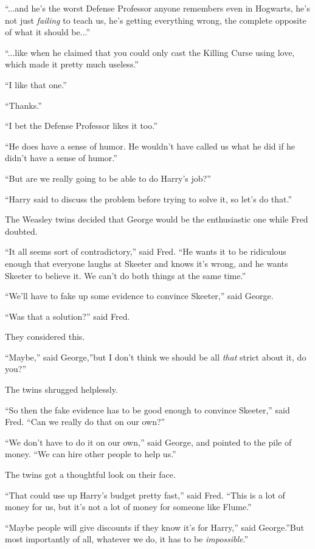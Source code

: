 ``...and he's the worst Defense Professor anyone remembers even in
Hogwarts, he's not just \emph{failing} to teach us, he's getting
everything wrong, the complete opposite of what it should be...''

``...like when he claimed that you could only cast the Killing
Curse using love, which made it pretty much useless.''

``I like that one.''

``Thanks.''

``I bet the Defense Professor likes it too.''

``He does have a sense of humor. He wouldn't have called us what he did
if he didn't have a sense of humor.''

``But are we really going to be able to do Harry's job?''

``Harry said to discuss the problem before trying to solve it, so let's
do that.''

The Weasley twins decided that George would be the enthusiastic one
while Fred doubted.

``It all seems sort of contradictory,'' said Fred. ``He wants it to be
ridiculous enough that everyone laughs at Skeeter and knows it's wrong,
and he wants Skeeter to believe it. We can't do both things at the same
time.''

``We'll have to fake up some evidence to convince Skeeter,'' said
George.

``Was that a solution?'' said Fred.

They considered this.

``Maybe,'' said George,''but I don't think we should be all \emph{that}
strict about it, do you?''

The twins shrugged helplessly.

``So then the fake evidence has to be good enough to convince Skeeter,''
said Fred. ``Can we really do that on our own?''

``We don't have to do it on our own,'' said George, and pointed to the
pile of money. ``We can hire other people to help us.''

The twins got a thoughtful look on their face.

``That could use up Harry's budget pretty fast,'' said Fred. ``This is a
lot of money for us, but it's not a lot of money for someone like
Flume.''

``Maybe people will give discounts if they know it's for Harry,'' said
George.''But most importantly of all, whatever we do, it has to be
\emph{impossible}.''

